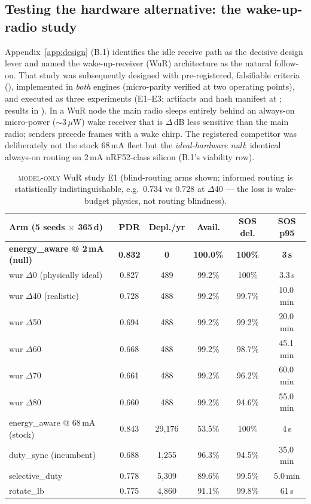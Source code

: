 \documentclass[11pt]{article}
\newcommand{\modelonly}{\textsc{model-only}}
\begin{document}
\subsection{Testing the hardware alternative: the wake-up-radio study}\label{sec:wur}

Appendix~\ref{app:design} (B.1) identifies the idle receive path as the
decisive design lever and named the wake-up-receiver (WuR) architecture as
the natural follow-on. That study was subsequently designed with
pre-registered, falsifiable criteria
(), implemented in \emph{both} engines
(micro-parity verified at two operating points), and executed as three
experiments (E1--E3; artifacts and hash manifest at
; results in
). In a WuR node the main radio
sleeps entirely behind an always-on micro-power (${\sim}3\,\mu$W) wake
receiver that is $\Delta$\,dB less sensitive than the main radio; senders
precede frames with a wake chirp. The registered competitor was
deliberately not the stock 68\,mA fleet but the \emph{ideal-hardware null}:
identical always-on routing on 2\,mA nRF52-class silicon (B.1's viability
row).

\begin{table}[h]
\centering\small
\setlength{\tabcolsep}{5pt}
\begin{tabular}{@{}lccccc@{}}
\toprule
Arm (5 seeds $\times$ 365\,d) & PDR & Depl./yr & Avail. & SOS del. & SOS p95 \\
\midrule
\textbf{energy\_aware @ 2\,mA (null)} & \textbf{0.832} & \textbf{0} & \textbf{100.0\%} & \textbf{100\%} & \textbf{3\,s} \\
wur $\Delta$0 (physically ideal) & 0.827 & 489 & 99.2\% & 100\% & 3.3\,s \\
wur $\Delta$40 (realistic) & 0.728 & 488 & 99.2\% & 99.7\% & 10.0\,min \\
wur $\Delta$50 & 0.694 & 488 & 99.2\% & 99.2\% & 20.0\,min \\
wur $\Delta$60 & 0.668 & 488 & 99.2\% & 98.7\% & 45.1\,min \\
wur $\Delta$70 & 0.661 & 488 & 99.2\% & 96.2\% & 60.0\,min \\
wur $\Delta$80 & 0.660 & 488 & 99.2\% & 94.6\% & 55.0\,min \\
energy\_aware @ 68\,mA (stock) & 0.843 & 29{,}176 & 53.5\% & 100\% & 4\,s \\
duty\_sync (incumbent) & 0.688 & 1{,}255 & 96.3\% & 94.5\% & 35.0\,min \\
selective\_duty & 0.778 & 5{,}309 & 89.6\% & 99.5\% & 5.0\,min \\
rotate\_lb & 0.775 & 4{,}860 & 91.1\% & 99.8\% & 61\,s \\
\bottomrule
\end{tabular}
\caption{\modelonly{} WuR study E1 (blind-routing arms shown; informed
routing is statistically indistinguishable, e.g.\ 0.734 vs 0.728 at
$\Delta$40 --- the loss is wake-budget physics, not routing blindness).}
\end{table}
\end{document}
